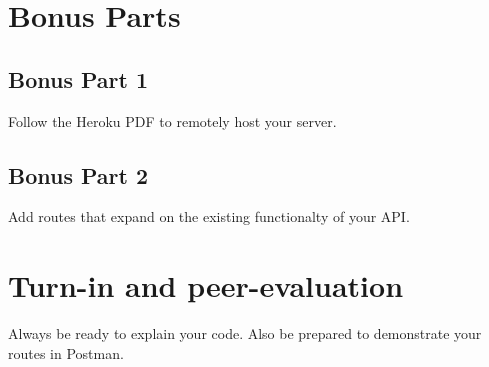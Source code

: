 \documentclass{42-en}
\begin{document}
\chapter{Bonus Parts}

\section{Bonus Part 1}
Follow the Heroku PDF to remotely host your server.

\section{Bonus Part 2}
Add routes that expand on the existing functionalty of your API.

\chapter{Turn-in and peer-evaluation}

Always be ready to explain your code. Also be prepared to demonstrate your routes in Postman.

\end{document}

